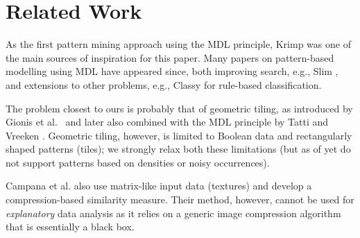 \documentclass{llncs}
\begin{document}
\section{Related Work}

As the first pattern mining approach using the MDL principle, Krimp \cite{krimp} was one of the main sources of inspiration for this paper. Many papers on pattern-based modelling using MDL have appeared since, both improving search, e.g., Slim \cite{slim}, and extensions to other problems, e.g., Classy \cite{classy} for rule-based classification.

The problem closest to ours is probably that of geometric tiling, as introduced by Gionis et al.\ \cite{gionis2004tiles} and later also combined with the MDL principle by Tatti and Vreeken \cite{tatti2012stijl}. Geometric tiling, however, is limited to Boolean data and rectangularly shaped patterns (tiles); we strongly relax both these limitations (but as of yet do not support patterns based on densities or noisy occurrences).

Campana et al. \cite{campana2010compression} also use matrix-like input data (textures) and develop a compression-based similarity measure. Their method, however, cannot be used for \emph{explanatory} data analysis as it relies on a generic image compression algorithm that is essentially a black box.

\end{document}
